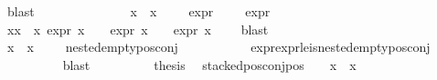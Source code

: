 \begin{isabellebody}
\ blast\isanewline
\ \ \ \ \ \ \isamarkupfalse%
\isanewline
\ \ \ \ \ \ \isamarkupfalse%
\ {\isachardoublequoteopen}{\isasymforall}{\isasympsi}{\isasymin}x{}{}\ {\isacharbackquote}{\kern0pt}\ x{}{}{\isachardot}{\kern0pt}\ {\isasympsi}\ {\isasymnoteq}\ {\isasymphi}\ {\isasymlongrightarrow}\ expr{\isacharunderscore}{\kern0pt}{}\ {\isasympsi}\ {\isasymle}\ {}\ {\isasymand}\ expr{\isacharunderscore}{\kern0pt}{}\ {\isasympsi}\ {\isasymle}\ {}{\isachardoublequoteclose}\isanewline
\ \ \ \ \ \ \ \ \isamarkupfalse%
\ {\isacartoucheopen}{\isasymforall}x{\isasymin}x{}{}\ {\isacharbackquote}{\kern0pt}\ x{}{}{\isachardot}{\kern0pt}\ expr{\isacharunderscore}{\kern0pt}{}\ x\ {\isasymle}\ {}\ {\isasymand}\ expr{\isacharunderscore}{\kern0pt}{}\ x\ {\isasymle}\ {}\ {\isasymand}\ expr{\isacharunderscore}{\kern0pt}{}\ x\ {\isasymle}\ {}{\isacartoucheclose}\ \isamarkupfalse%
\ blast\isanewline
\ \ \ \ \ \ \isamarkupfalse%
\ {\isachardoublequoteopen}{\isasymforall}{\isasympsi}{\isasymin}x{}{}\ {\isacharbackquote}{\kern0pt}\ x{}{}{\isachardot}{\kern0pt}\ {\isasympsi}\ {\isasymnoteq}\ {\isasymphi}\ {\isasymlongrightarrow}\ nested{\isacharunderscore}{\kern0pt}empty{\isacharunderscore}{\kern0pt}pos{\isacharunderscore}{\kern0pt}conj\ {\isasympsi}{\isachardoublequoteclose}\isanewline
\ \ \ \ \ \ \ \ \isamarkupfalse%
\ expr{\isacharunderscore}{\kern0pt}{}{\isacharunderscore}{\kern0pt}expr{\isacharunderscore}{\kern0pt}{}{\isacharunderscore}{\kern0pt}le{\isacharunderscore}{\kern0pt}{}{\isacharunderscore}{\kern0pt}is{\isacharunderscore}{\kern0pt}nested{\isacharunderscore}{\kern0pt}empty{\isacharunderscore}{\kern0pt}pos{\isacharunderscore}{\kern0pt}conj\isanewline
\ \ \ \ \ \ \ \ \isamarkupfalse%
\ blast\isanewline
\ \ \ \ \ \ \isamarkupfalse%
\ \isamarkupfalse%
\ {\isacharquery}{\kern0pt}thesis\ \isamarkupfalse%
\ {\isacartoucheopen}stacked{\isacharunderscore}{\kern0pt}pos{\isacharunderscore}{\kern0pt}conj{\isacharunderscore}{\kern0pt}pos\ {\isasymphi}{\isacartoucheclose}\ {\isacartoucheopen}{\isasymphi}\ {\isasymin}\ {\isacharparenleft}{\kern0pt}x{}{}\ {\isacharbackquote}{\kern0pt}\ x{}{}{\isacharparenright}{\kern0pt}{\isacartoucheclose}\isanewline

\end{isabellebody}

